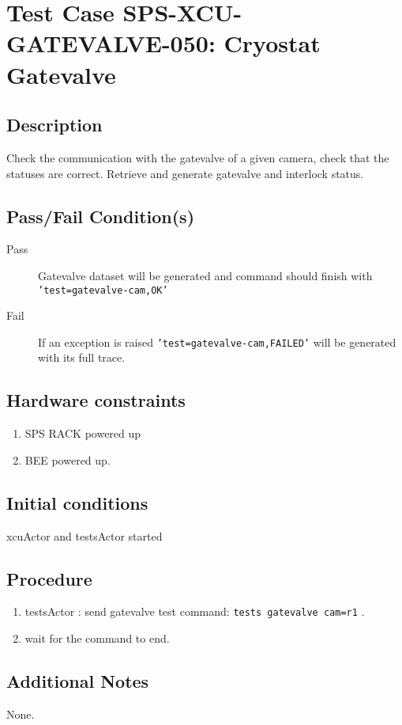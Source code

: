 \section{Test Case SPS-XCU-GATEVALVE-050: Cryostat Gatevalve}

\subsection{Description}

Check the communication with the gatevalve of a given camera, check that the statuses are correct.
Retrieve and generate gatevalve and interlock status.

\subsection{Pass/Fail Condition(s)}

\begin{description}
\item [Pass] Gatevalve dataset will be generated and command should finish with \texttt{'test=gatevalve-cam,OK'}
\item [Fail] If an exception is raised \texttt{'test=gatevalve-cam,FAILED'} will be generated with its full trace.

\end{description}

\subsection{Hardware constraints}

\begin{enumerate}
    \item SPS RACK powered up
    \item BEE powered up.
\end{enumerate}

\subsection{Initial conditions}

xcuActor and testsActor started

\subsection{Procedure}

\begin{enumerate}
    \item testsActor : send gatevalve test command: \texttt{tests gatevalve cam=r1} .
    \item wait for the command to end.
\end{enumerate}

\subsection{Additional Notes}
None.
